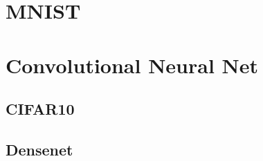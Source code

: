 \section{MNIST}


\section{Convolutional Neural Net}

\subsection{CIFAR10}

\subsection{Densenet}



